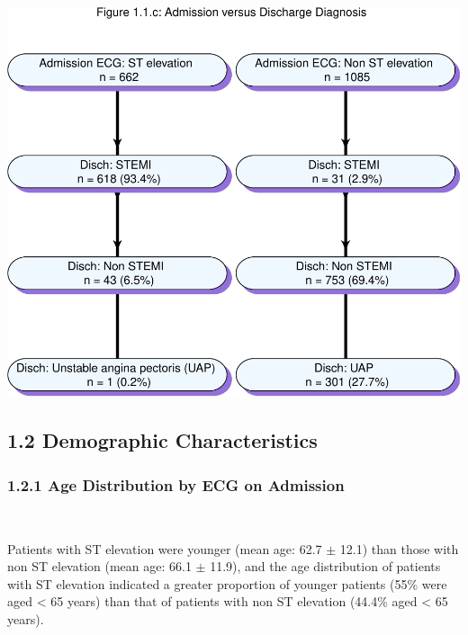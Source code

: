 \documentclass[
]{article}
\begin{document}
~

\includegraphics{ACSIS_2024_v1_pdf_files/figure-latex/unnamed-chunk-7-1.pdf}

\pagebreak

\subsection{1.2 Demographic
Characteristics}\label{demographic-characteristics}

\subsubsection{1.2.1 Age Distribution by ECG on
Admission}\label{age-distribution-by-ecg-on-admission}

~

Patients with ST elevation were younger (mean age: 62.7 \(\pm\) 12.1)
than those with non ST elevation (mean age: 66.1 \(\pm\) 11.9), and the
age distribution of patients with ST elevation indicated a greater
proportion of younger patients (55\% were aged \textless{} 65 years)
than that of patients with non ST elevation (44.4\% aged \textless{} 65
years).

~
\end{document}
